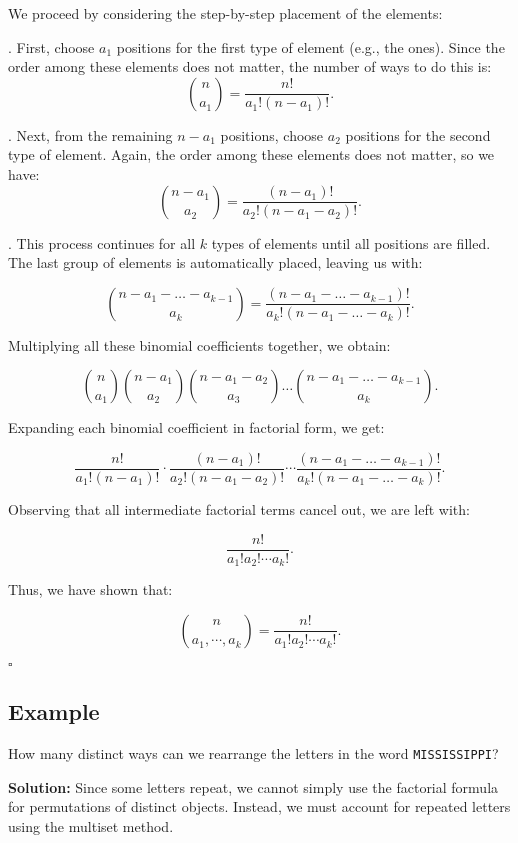 \documentclass[12pt]{article}
\begin{document}
\noindent
We proceed by considering the step-by-step placement of the elements:

. First, choose \(a_1\) positions for the first type of element (e.g., the ones). Since the order among these elements does not matter, the number of ways to do this is:
   \[
   \binom{n}{a_1} = \frac{n!}{a_1!(n - a_1)!}.
   \]

. Next, from the remaining \(n - a_1\) positions, choose \(a_2\) positions for the second type of element. Again, the order among these elements does not matter, so we have:
   \[
   \binom{n - a_1}{a_2} = \frac{(n - a_1)!}{a_2!(n - a_1 - a_2)!}.
   \]

   . This process continues for all \(k\) types of elements until all positions are filled. The last group of elements is automatically placed, leaving us with:

   \[
   \binom{n - a_1 - \dots - a_{k-1}}{a_k} = \frac{(n - a_1 - \dots - a_{k-1})!}{a_k!(n - a_1 - \dots - a_k)!}.
   \]

\noindent
Multiplying all these binomial coefficients together, we obtain:

\[
\binom{n}{a_1} \binom{n - a_1}{a_2} \binom{n - a_1 - a_2}{a_3} \dots \binom{n - a_1 - \dots - a_{k-1}}{a_k}.
\]

\noindent
Expanding each binomial coefficient in factorial form, we get:

\[
\frac{n!}{a_1!(n - a_1)!} \cdot \frac{(n - a_1)!}{a_2!(n - a_1 - a_2)!} \cdots \frac{(n - a_1 - \dots - a_{k-1})!}{a_k!(n - a_1 - \dots - a_k)!}.
\]

\noindent
Observing that all intermediate factorial terms cancel out, we are left with:

\[
\frac{n!}{a_1! a_2! \cdots a_k!}.
\]

\noindent
Thus, we have shown that:

\[
\binom{n}{a_1,\cdots,a_k} = \frac{n!}{a_1! a_2! \cdots a_k!}.
\]

\noindent
\(\square\)

\subsection*{Example}
How many distinct ways can we rearrange the letters in the word \texttt{MISSISSIPPI}?

\noindent
\textbf{Solution:}  
Since some letters repeat, we cannot simply use the factorial formula for permutations of distinct objects. Instead, we must account for repeated letters using the multiset method.
\end{document}
